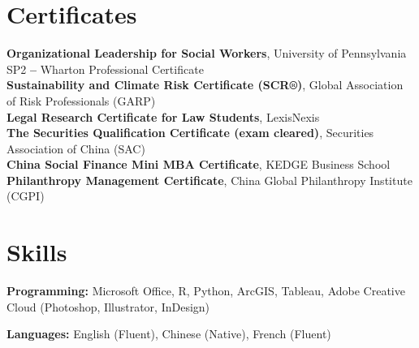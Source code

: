 \documentclass[letterpaper,11pt]{article}
\newcommand{\resumeSubHeadingListStart}{\begin{itemize}[leftmargin=0.15in, label={}]}
\newcommand{\resumeSubHeadingListEnd}{\end{itemize}}
\begin{document}
\section{Certificates}
  \vspace{3pt}
  \resumeSubHeadingListStart
    \small{\item{
        \textbf{Organizational Leadership for Social Workers}{, University of Pennsylvania SP2 \textbf{--} Wharton Professional Certificate} \\ \vspace{3pt}
        \textbf{Sustainability and Climate Risk Certificate (SCR®)}{, Global Association of Risk Professionals (GARP)} \\ \vspace{3pt}
        \textbf{Legal Research Certificate for Law Students}{, LexisNexis} \\ \vspace{3pt}
        \textbf{The Securities Qualification Certificate (exam cleared)}{, Securities Association of China (SAC)} \\ \vspace{3pt}
        \textbf{China Social Finance Mini MBA Certificate}{, KEDGE Business School} \\ \vspace{3pt}
        \textbf{Philanthropy Management Certificate}, {China Global Philanthropy Institute (CGPI)} \\ \vspace{3pt}


    }}
  \resumeSubHeadingListEnd



\section{Skills}
  \vspace{3pt}
  \resumeSubHeadingListStart
    \small{\item{
        \textbf{Programming:}{ Microsoft Office, R, Python, ArcGIS, Tableau, Adobe Creative Cloud (Photoshop, Illustrator, InDesign)} \\ \vspace{3pt}
        
        
        \textbf{Languages:}{ English (Fluent), Chinese (Native), French (Fluent)}
        
    }}
  \resumeSubHeadingListEnd
\end{document}
